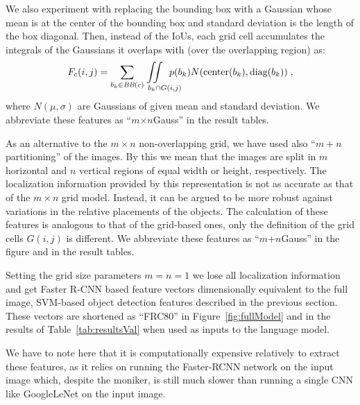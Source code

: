 We also experiment with replacing the bounding box with a Gaussian whose mean is
at the center of the bounding box and standard deviation is the length of the
box diagonal.
Then, instead of the IoUs, each grid cell accumulates the integrals of the
Gaussians it overlaps with (over the overlapping region) as:
\begin{equation} \label{eqn:Gauss} F_c(i,j) = \sum_{b_k \in \text{\it
        BB}(c)}\text{\hspace*{-7mm}} \iint\displaylimits_%
{\text{\hspace{9mm}}b_k \cap G(i,j)}\text{\hspace*{-5mm}}
p(b_k)N(\text{center}(b_k),\text{diag}(b_k)) \; , \end{equation}
where $N(\mu,\sigma)$ are Gaussians of given mean and standard deviation.
We abbreviate these features as ``$m$$\times${}$n$Gauss'' in the result tables.

As an alternative to the $m\times n$ non-overlapping grid, we have used also
``$m+n$ partitioning'' of the images.
By this we mean that the images are split in $m$ horizontal and $n$ vertical
regions of equal width or height, respectively.
The localization information provided by this representation is not as accurate
as that of the $m\times n$ grid model.
Instead, it can be argued to be more robust against variations in the relative
placements of the objects.
The calculation of these features is analogous to that of the grid-based ones,
only the definition of the grid cells $G(i,j)$ is different.
We abbreviate these features as ``$m$+$n$Gauss'' in the figure and in the result
tables.

Setting the grid size parameters $m=n=1$ we lose all localization information
and get Faster R-CNN based feature vectors dimensionally equivalent to the full
image, SVM-based object detection features described in the previous section.
These vectors are shortened as ``FRC80'' in Figure~\ref{fig:fullModel} and in
the results of Table~\ref{tab:resultsVal} when used as inputs to the language
model.

We have to note here that it is computationally expensive relatively to extract
these features, as it relies on running the Faster-RCNN network on the input
image which, despite the moniker, is still much slower than running a single CNN
like GoogleLeNet on the input image.


